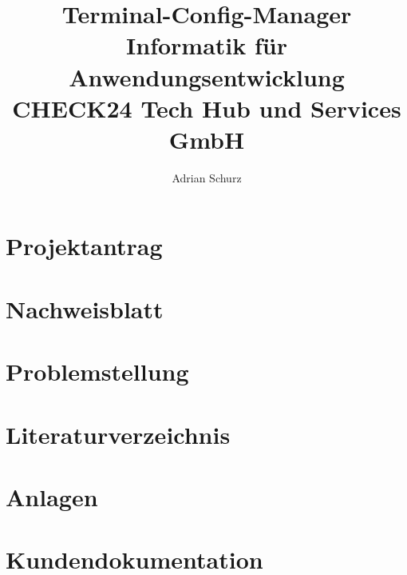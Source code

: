 \documentclass[a4paper,11pt,draft=false]{scrartcl} %
\author{Adrian Schurz}
\title{Terminal-Config-Manager\\
	Informatik für Anwendungsentwicklung\\
	CHECK24 Tech Hub und Services GmbH\\
	}
\begin{document}

\maketitle
{}
\newpage

\section{Projektantrag}


\section{Nachweisblatt}
\paragraph{}

\newpage
\tableofcontents
\newpage


\section{Problemstellung}

\section{Literaturverzeichnis}

\section{Anlagen}

\section{Kundendokumentation}











\printglossaries
\end{document}
